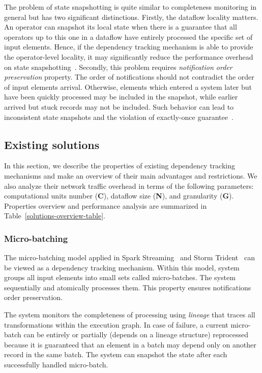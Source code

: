 The problem of state snapshotting is quite similar to completeness monitoring in general but has two significant distinctions. Firstly, the dataflow locality matters. An operator can snapshot its local state when there is a guarantee that all operators up to this one in a dataflow have entirely processed the specific set of input elements. Hence, if the dependency tracking mechanism is able to provide the operator-level locality, it may significantly reduce the performance overhead on state snapshotting~\cite{Carbone:2017:SMA:3137765.3137777}. Secondly, this problem requires {\em notification order preservation} property. The order of notifications should not contradict the order of input elements arrival. Otherwise, elements which entered a system later but have been quickly processed may be included in the snapshot, while earlier arrived but stuck records may not be included. Such behavior can lead to inconsistent state snapshots and the violation of exactly-once guarantee~\cite{2015arXiv150608603C}. 

\subsection{Existing solutions} \label{existing_solutions}

In this section, we describe the properties of existing dependency tracking mechanisms and make an overview of their main advantages and restrictions. We also analyze their network traffic overhead in terms of the following parameters: computational units number (\textbf{C}), dataflow size (\textbf{N}), and granularity (\textbf{G}). Properties overview and performance analysis are summarized in Table~\ref{solutions-overview-table}.

\subsubsection{Micro-batching}

The micro-batching model applied in Spark Streaming~\cite{Zaharia:2012:DSE:2342763.2342773} and Storm Trident~\cite{apache:storm:trident} can be viewed as a dependency tracking mechanism. Within this model, system groups all input elements into small sets called micro-batches. The system sequentially and atomically processes them. This property ensures notifications order preservation. 

The system monitors the completeness of processing using {\em lineage} that traces all transformations within the execution graph. In case of failure, a current micro-batch can be entirely or partially (depends on a lineage structure) reprocessed because it is guaranteed that an element in a batch may depend only on another record in the same batch. The system can snapshot the state after each successfully handled micro-batch. 

